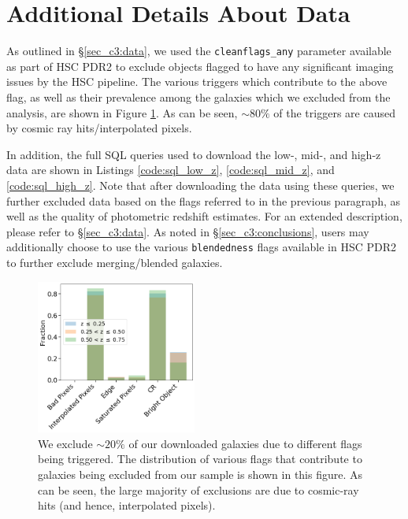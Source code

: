 \section{Additional Details About Data}\label{ap:data}

As outlined in \S\ref{sec_c3:data}, we used the \texttt{cleanflags\_any} parameter available as part of HSC PDR2 to exclude objects flagged to have any significant imaging issues by the HSC pipeline. The various triggers which contribute to the above flag, as well as their prevalence among the galaxies which we excluded from the analysis, are shown in Figure \ref{fig_c3:flag_distr}. As can be seen, $\sim80\%$ of the triggers are caused by cosmic ray hits/interpolated pixels. 


In addition, the full SQL queries used to download the low-, mid-, and high-z data are shown in Listings \ref{code:sql_low_z}, \ref{code:sql_mid_z}, and \ref{code:sql_high_z}. Note that after downloading the data using these queries, we further excluded data based on the flags referred to in the previous paragraph, as well as the quality of photometric redshift estimates. For an extended description, please 
refer to \S \ref{sec_c3:data}. As noted in \S \ref{sec_c3:conclusions}, users may additionally choose to use the various \texttt{blendedness} flags available in HSC PDR2 to further exclude merging/blended galaxies. 

\begin{figure}[htb]
    \centering
    \includegraphics[width = 0.47\textwidth]{flag_distr.png}
    \caption{We exclude $\sim20\%$ of our downloaded galaxies due to different flags being triggered. The distribution of various flags that contribute to galaxies being excluded from our sample is shown in this figure. As can be seen, the large majority of exclusions are due to cosmic-ray hits (and hence, interpolated pixels). }
    \label{fig_c3:flag_distr}
\end{figure}


